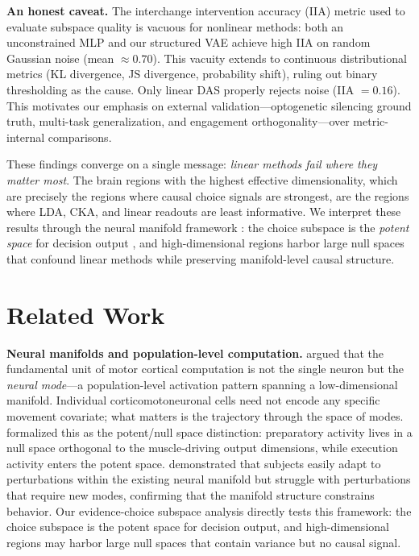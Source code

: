 \documentclass{article}
\begin{document}
\textbf{An honest caveat.} The interchange intervention accuracy (IIA) metric used to evaluate subspace quality is vacuous for nonlinear methods: both an unconstrained MLP and our structured VAE achieve high IIA on random Gaussian noise (mean $\approx 0.70$). This vacuity extends to continuous distributional metrics (KL divergence, JS divergence, probability shift), ruling out binary thresholding as the cause. Only linear DAS properly rejects noise (IIA $= 0.16$). This motivates our emphasis on external validation---optogenetic silencing ground truth, multi-task generalization, and engagement orthogonality---over metric-internal comparisons.

These findings converge on a single message: \emph{linear methods fail where they matter most}. The brain regions with the highest effective dimensionality, which are precisely the regions where causal choice signals are strongest, are the regions where LDA, CKA, and linear readouts are least informative. We interpret these results through the neural manifold framework \citep{gallego2017neural}: the choice subspace is the \emph{potent space} for decision output \citep{kaufman2014cortical}, and high-dimensional regions harbor large null spaces that confound linear methods while preserving manifold-level causal structure.

\section{Related Work}

\textbf{Neural manifolds and population-level computation.} \citet{gallego2017neural} argued that the fundamental unit of motor cortical computation is not the single neuron but the \emph{neural mode}---a population-level activation pattern spanning a low-dimensional manifold. Individual corticomotoneuronal cells need not encode any specific movement covariate; what matters is the trajectory through the space of modes. \citet{kaufman2014cortical} formalized this as the potent/null space distinction: preparatory activity lives in a null space orthogonal to the muscle-driving output dimensions, while execution activity enters the potent space. \citet{sadtler2014neural} demonstrated that subjects easily adapt to perturbations within the existing neural manifold but struggle with perturbations that require new modes, confirming that the manifold structure constrains behavior. Our evidence-choice subspace analysis directly tests this framework: the choice subspace is the potent space for decision output, and high-dimensional regions may harbor large null spaces that contain variance but no causal signal.
\end{document}
